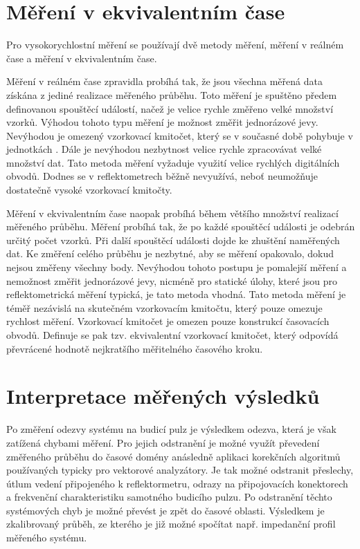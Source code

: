 \section{Měření v ekvivalentním čase}
Pro vysokorychlostní měření se používají dvě metody měření, měření v reálném čase a měření v ekvivalentním čase.

Měření v reálném čase zpravidla probíhá tak, že jsou všechna měřená data získána z jediné realizace měřeného průběhu. Toto měření je spuštěno předem definovanou spouštěcí událostí, načež je velice rychle změřeno velké množství vzorků. Výhodou tohoto typu měření je možnost změřit jednorázové jevy. Nevýhodou je omezený vzorkovací kmitočet, který se v současné době pohybuje v jednotkách \si{\gigasample}. Dále je nevýhodou nezbytnost velice rychle zpracovávat velké množství dat. Tato metoda měření vyžaduje využití velice rychlých digitálních obvodů. Dodnes se v reflektometrech běžně nevyužívá, neboť neumožňuje dostatečně vysoké vzorkovací kmitočty.

Měření v ekvivalentním čase naopak probíhá během většího množství realizací měřeného průběhu. Měření probíhá tak, že po každé spouštěcí události je odebrán určitý počet vzorků. Při další spouštěcí události dojde ke zhuštění naměřených dat. Ke změření celého průběhu je nezbytné, aby se měření opakovalo, dokud nejsou změřeny všechny body. Nevýhodou tohoto postupu je pomalejší měření a nemožnost změřit jednorázové jevy, nicméně pro statické úlohy, které jsou pro reflektometrická měření typická, je tato metoda vhodná. Tato metoda měření je téměř nezávislá na skutečném vzorkovacím kmitočtu, který pouze omezuje rychlost měření. Vzorkovací kmitočet je omezen pouze konstrukcí časovacích obvodů. Definuje se pak tzv. ekvivalentní vzorkovací kmitočet, který odpovídá převrácené hodnotě nejkratšího měřitelného časového kroku.

\section{Interpretace měřených výsledků}
Po změření odezvy systému na budicí pulz je výsledkem odezva, která je však zatížená chybami měření. Pro jejich odstranění je možné využít převedení změřeného průběhu do časové domény anásledně aplikaci korekčních algoritmů používaných typicky pro vektorové analyzátory. Je tak možné odstranit přeslechy, útlum vedení připojeného k reflektormetru, odrazy na připojovacích konektorech a frekvenční charakteristiku samotného budicího pulzu.
Po odstranění těchto systémových chyb je možné převést je zpět do časové oblasti. Výsledkem je zkalibrovaný průběh, ze kterého je již možné spočítat např. impedanční profil měřeného systému.



